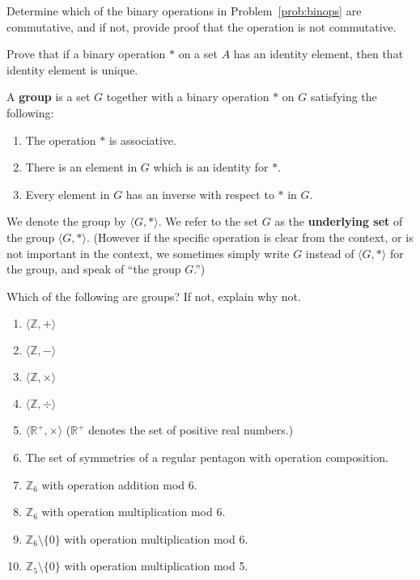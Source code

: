 \begin{problem}
Determine which of the binary operations in Problem~\ref{prob:binops} are commutative, and if not, provide proof that the operation is not commutative.
\end{problem}

\begin{problem}
Prove that if a binary operation \(*\) on a set \(A\) has an identity element, then that identity element is unique.
\end{problem}

\begin{definition}
A \textbf{group} is a set \(G\) together with a binary operation \(*\) on \(G\) satisfying the following:
\begin{enumerate}
  \item The operation \(*\) is associative.
  \item There is an element in \(G\) which is an identity for \(*\).
  \item Every element in \(G\) has an inverse with respect to \(*\) in \(G\).
\end{enumerate}
We denote the group by \(\langle G, * \rangle\). We refer to the set \(G\) as the \textbf{underlying set} of the group \(\langle G, * \rangle\). (However if the specific operation is clear from the context, or is not important in the context, we sometimes simply write \(G\) instead of \(\langle G, * \rangle\) for the group, and speak of ``the group \(G\).'')
\end{definition}

\begin{problem}\label{prob:groupex}
Which of the following are groups? If not, explain why not.
\begin{enumerate}
  \item  \(\langle \mathbb{Z}, + \rangle\)
  \item  \(\langle \mathbb{Z}, - \rangle\)
  \item  \(\langle \mathbb{Z}, \times \rangle\)
  \item  \(\langle \mathbb{Z}, \div \rangle\)
  \item  \(\langle \mathbb{R}^+, \times \rangle\) (\(\mathbb{R}^+\) denotes the set of positive real numbers.)
  \item  The set of symmetries of a regular pentagon with operation composition.
  \item  \(\mathbb{Z}_6\) with operation addition mod 6.
  \item  \(\mathbb{Z}_6\) with operation multiplication mod 6.
  \item  \(\mathbb{Z}_6 \setminus \{0\}\) with operation multiplication mod 6.
  \item  \(\mathbb{Z}_5 \setminus \{0\}\) with operation multiplication mod 5.
\end{enumerate}
\end{problem}

